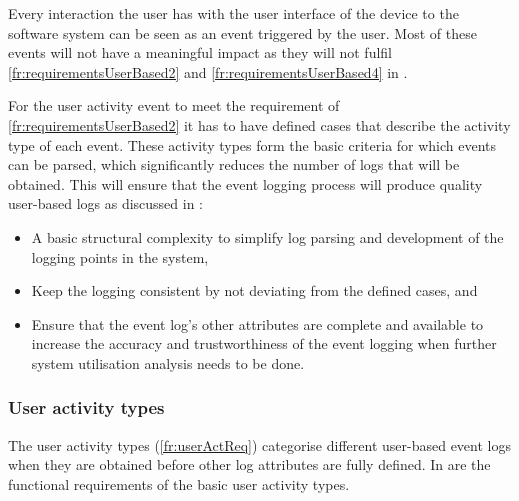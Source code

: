Every interaction the user has with the user interface of the device to the software system can be seen as an event triggered by the user. Most of these events will not have a meaningful impact as they will not fulfil \ref{fr:requirementsUserBased2} and \ref{fr:requirementsUserBased4} in .\par For the user activity event to meet the requirement of \ref{fr:requirementsUserBased2} it has to have defined cases that describe the activity type of each event. These activity types form the basic criteria for which events can be parsed, which significantly reduces the number of logs that will be obtained. This will ensure that the event logging process will produce quality user-based logs as discussed in :

\begin{itemize}
	\item A basic structural complexity to simplify log parsing and development of the logging points in the system,
	\item Keep the logging consistent by not deviating from the defined cases, and
	\item Ensure that the event log's other attributes are complete and available to increase the accuracy and trustworthiness of the event logging when further system utilisation analysis needs to be done. 
\end{itemize}

\subsubsection{User activity types}\label{sec:ch2_userActivityTypes}
The user activity types (\ref{fr:userActReq}) categorise different user-based event logs when they are obtained before other log attributes are fully defined. In  are the functional requirements of the basic user activity types.

